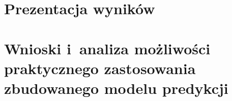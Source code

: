 \section{Prezentacja wyników}\label{sec:analysis:important-features}
\todo{}
\section{Wnioski i~analiza możliwości praktycznego zastosowania zbudowanego modelu predykcji}\label{sec:analysis:model-fitness}

\thispagestyle{normal}

